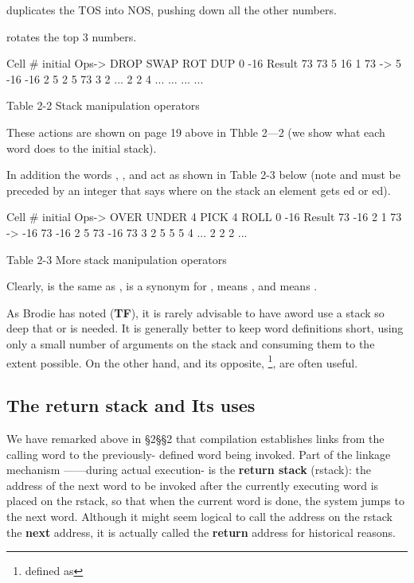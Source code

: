  duplicates the TOS into NOS, pushing down all the other numbers.

 rotates the top 3 numbers.

Cell \# 	initial 	Ops->	DROP 	SWAP	ROT		DUP
0		-16		Result	73		73		5		16
1		73		->		5		-16		-16
2		5				2		5		73
3		2				...		2		2
4		...				...		...		...

Table 2-2 Stack manipulation operators

These actions are shown on page 19 above in Thble 2—2 (we show what each word does to the initial stack).

In addition the words , ,  and  act as shown in Table 2-3 below (note  and  must be preceded by an integer that says where on the stack an element gets  ed or ed).

Cell \# 	initial		Ops->	OVER	UNDER	4 PICK	4 ROLL
0 		-16		 Result 	73 		-16		2
1 		73 		-> 		-16		73		-16
2 		5 				73 		-16		73
3 		2				5 		5		5
4 		...				2		2		2		...

Table 2-3 More stack manipulation operators

Clearly,  is the same as ,  is a synonym for ,  means , and  means .

As Brodie has noted (\textbf{TF}), it is rarely advisable to have aword use a stack so deep that  or  is needed. It is generally better to keep word definitions short, using only a small number of arguments on the stack and consuming them to the extent possible. On the other hand,  and its opposite, \footnote{defined as }, are often useful.

\subsection{The return stack and Its uses}

We have remarked above in §2§§2 that compilation establishes links from the calling word to the previously- defined word being invoked. Part of the linkage mechanism ——during actual execution- is the \textbf{return stack} (rstack): the address of the next word to be invoked after the currently executing word is placed on the rstack, so that when the current word is done, the system jumps to the next word. Although it might seem logical to call the address on the rstack the \textbf{next} address, it is actually called the \textbf{return} address for historical reasons.

